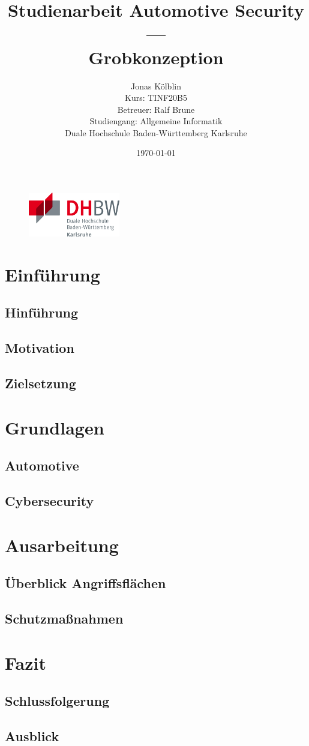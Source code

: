 \documentclass[
   ngerman          %
  ,a4paper          %
  ,12pt
  ,pdftex
]{article}
\title{Studienarbeit Automotive Security \\ --- \\ Grobkonzeption \vspace{4cm}}
\author{
        Jonas Kölblin \\
		Kurs: TINF20B5 \\
		Betreuer: Ralf Brune \\
		Studiengang: Allgemeine Informatik \\
        Duale Hochschule Baden-Württemberg Karlsruhe        
}
\date{\today}
\begin{document}
\begin{figure}[t]
\flushright
\includegraphics[width=4cm]{dhbw-logo}
\end{figure}

\maketitle


\newpage
\tableofcontents
\newpage
\section{Einführung}
\subsection{Hinführung}
\subsection{Motivation}
\subsection{Zielsetzung}

\section{Grundlagen}
\subsection{Automotive}

\subsection{Cybersecurity}



\section{Ausarbeitung}
\subsection{Überblick Angriffsflächen}
\subsection{Schutzmaßnahmen}

\section{Fazit}
\subsection{Schlussfolgerung}
\subsection{Ausblick}


%
%
\end{document}
